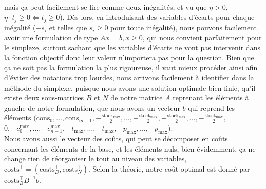 \documentclass{article}
\begin{document}
mais ça peut facilement se lire comme deux inégalités, et vu que $\eta > 0$, $\eta \cdot t_j \geq 0 \iff t_j \geq 0$). Dès lors, en introduisant des variables d'écarts pour chaque inégalité ($-s_i$ et telles que $s_i \geq 0$ pour toute inégalité), nous
pouvons facilement avoir une formulation de type $Ax = b, x \geq 0$, qui nous convient parfaitement pour le simplexe, surtout sachant que les 
variables d'écarts ne vont pas intervenir dans la fonction objectif donc leur valeur n'importera pas pour la question. Bien que ça ne soit 
pas la formulation la plus rigoureuse, il vaut mieux procéder ainsi afin d'éviter des notations trop lourdes, nous arrivons
facilement à identifier dans la méthode du simplexe, puisque nous avons une solution optimale bien finie, qu'il existe deux sous-matrices
$B$ et $N$ de notre matrice $A$ reprenant les éléments à gauche de notre formulation, que nous avons un vecteur 
$b$ qui reprend les éléments
$(\mathrm{cons}_0, \ldots, \mathrm{cons}_{m-1}, -\frac{\mathrm{stock}_\mathrm{max}}{2}, \ldots, 
-\frac{\mathrm{stock}_\mathrm{max}}{2}, -\frac{\mathrm{stock}_\mathrm{max}}{2}, \ldots, 
-\frac{\mathrm{stock}_\mathrm{max}}{2},$ \\ $ 0, -c_0^\mathrm{max}, \ldots, -c_{n-1}^\mathrm{max},
-t_\mathrm{max}, \ldots, -t_\mathrm{max}, -p_\mathrm{max}, \ldots, -p_\mathrm{max}) $. \\ 
Nous avons aussi le vecteur des coûts, qui peut se décomposer en coûts concernant les éléments de la base, et les éléments nuls,
bien évidemment, ça ne change rien de réorganiser le tout au niveau des variables, 
$\mathrm{costs}^\intercal = (\mathrm{costs}^\intercal_{B}, \mathrm{costs}^\intercal_{N})$.
Selon la théorie, notre coût optimal est donné par $\mathrm{costs}^\intercal_{B} B^{-1} b$.
\end{document}
